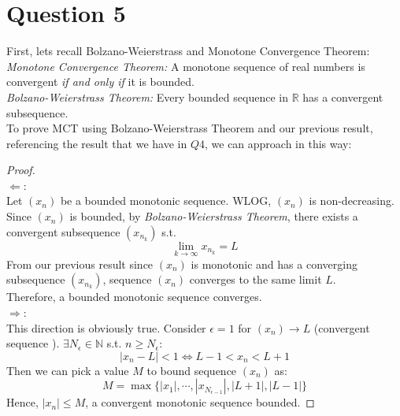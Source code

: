 \documentclass{article}
\begin{document}
\section*{Question 5}
\noindent First, lets recall Bolzano-Weierstrass and Monotone Convergence Theorem:
\\
\textit{Monotone Convergence Theorem: } A monotone sequence of real numbers is convergent \textit{if and only if} it is bounded.
\\
\textit{Bolzano-Weierstrass Theorem: } Every bounded sequence in $\mathbb{R}$ has a convergent subsequence.
\\
To prove MCT using Bolzano-Weierstrass Theorem and our previous result, referencing the result that we have in $Q4$, we can approach in this way:
\begin{proof}
    \hspace{0.001cm}
    \\
    $\Leftarrow$: 
    \\
    Let $(x_n)$ be a bounded monotonic sequence. WLOG, $(x_n)$ is non-decreasing.
    \\
    Since $(x_n)$ is bounded, by \textit{Bolzano-Weierstrass Theorem}, there exists a convergent subsequence $(x_{n_k})$ s.t.
    \[ \lim_{k \rightarrow \infty} x_{n_k} = L \]
    From our previous result since $(x_n)$ is monotonic and has a converging subsequence $(x_{n_k})$, sequence $(x_n)$ converges to the same limit $L$.
    \\
    Therefore, a bounded monotonic sequence converges.
    \\
    $\Rightarrow$: 
    \\
    This direction is obviously true. Consider $\epsilon = 1$ for $(x_n) \rightarrow L$ (convergent sequence ).
    $\exists N_{\epsilon} \in \mathbb{N}$ s.t. $n \geq N_{\epsilon}$:
    \[ |x_n - L| < 1 \Leftrightarrow L - 1 < x_n < L + 1 \]
    Then we can pick a value $M$ to bound sequence $(x_n)$ as:
    \[ M = \max \{|x_1|, \cdots, |x_{N_{\epsilon - 1}}|, |L + 1|, |L - 1|\} \]
    Hence, $|x_n| \leq M$, a convergent monotonic sequence bounded.
\end{proof}
\end{document}
